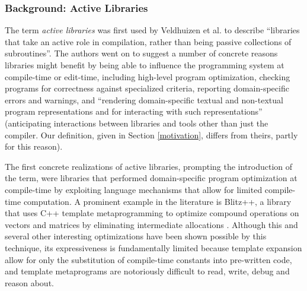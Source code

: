\subsubsection{Background: Active Libraries}\label{alibs}
The term \emph{active libraries} was first used by Veldhuizen et al. \cite{atthesis, atpaper} to describe ``libraries that take an active role in compilation, rather than being passive collections of subroutines''. The authors went on to suggest a number of concrete reasons libraries might benefit by being able to influence the programming system at compile-time or edit-time, including high-level program optimization, checking programs for correctness against specialized criteria, reporting domain-specific errors and warnings, and ``rendering domain-specific textual and non-textual program representations and for interacting with such representations'' (anticipating interactions between libraries and tools other than just the compiler. Our definition, given in Section \ref{motivation}, differs  from theirs, partly for this reason). 

The first concrete realizations of active libraries, prompting the introduction of the term, were libraries that performed domain-specific program optimization at compile-time by exploiting language mechanisms that allow for limited compile-time computation. A prominent example in the literature is Blitz++, a library that uses C++ template metaprogramming to optimize compound operations on vectors and matrices by eliminating intermediate allocations \cite{blitzpp}. Although this and several other interesting optimizations have been shown possible by this technique, its expressiveness is fundamentally limited because template expansion allow for only the substitution of compile-time constants into pre-written code, and template metaprograms are notoriously difficult to read, write, debug and reason about. %


